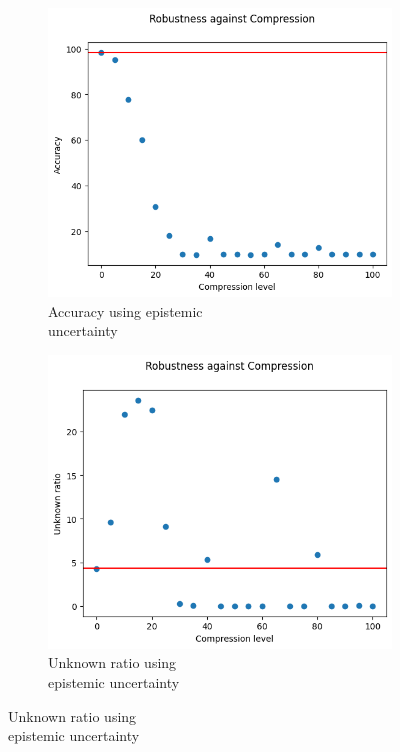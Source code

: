 \begin{figure}[H]
	\centering
	\begin{subfigure}{.33\textwidth}
		\centering
		\includegraphics[width=0.9\linewidth]{ImageFiles/EvalBNN/CO/EU/acc}
		\caption{Accuracy using epistemic \\ uncertainty}
		\label{fig:co_eu_acc}
	\end{subfigure}%
	\begin{subfigure}{.33\textwidth}
		\centering
		\includegraphics[width=0.9\linewidth]{ImageFiles/EvalBNN/CO/EU/unkn}
		\caption{Unknown ratio using \\ epistemic uncertainty}
		\label{fig:co_eu_unkn}
	\end{subfigure}%

\end{figure}
